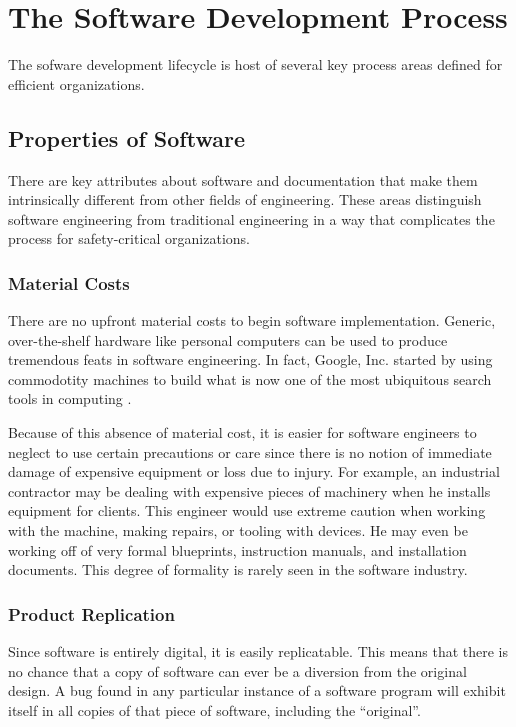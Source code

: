 \section{The Software Development Process}
\label{sdp}
The sofware development lifecycle is host of several key process areas defined
for efficient organizations.

\subsection{Properties of Software}\label{software_props}

There are key attributes about software and documentation that make them 
intrinsically different from other fields of engineering. These areas 
distinguish software engineering from traditional engineering in a way that 
complicates the process for safety-critical organizations.

\subsubsection*{Material Costs}

There are no upfront material costs to begin software implementation. Generic,
over-the-shelf hardware like personal computers can be used to produce
tremendous feats in software engineering. In fact, Google, Inc. started by using
commodotity machines to build what is now one of the most ubiquitous search 
tools in computing \cite{Google}.

Because of this absence of material cost, it is easier for software engineers to
neglect to use certain precautions or care since there is no notion of immediate
damage of expensive equipment or loss due to injury. For example, an industrial
contractor may be dealing with expensive pieces of machinery when he installs
equipment for clients. This engineer would use extreme caution when working with
the machine, making repairs, or tooling with devices. He may even be working off
of very formal blueprints, instruction manuals, and installation documents. This
degree of formality is rarely seen in the software industry.

\subsubsection*{Product Replication}\label{software_product}
Since software is entirely digital, it is easily replicatable. This means that
there is no chance that a copy of software can ever be a diversion from the
original design. A bug found in any particular instance of a software program
will exhibit itself in all copies of that piece of software, including the
``original''.

